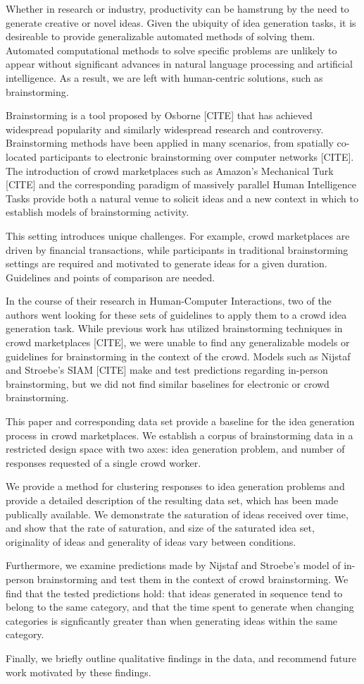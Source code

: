 Whether in research or industry, productivity can be hamstrung by the need to generate creative or novel ideas. Given the ubiquity of idea generation tasks, it is desireable to provide generalizable automated methods of solving them. Automated computational methods to solve specific problems are unlikely to appear without significant advances in natural language processing and artificial intelligence. As a result, we are left with human-centric solutions, such as brainstorming.

Brainstorming is a tool proposed by Osborne [CITE] that has achieved widespread popularity and similarly widespread research and controversy. Brainstorming methods have been applied in many scenarios, from spatially co-located participants to electronic brainstorming over computer networks [CITE]. The introduction of crowd marketplaces such as Amazon's Mechanical Turk [CITE] and the corresponding paradigm of massively parallel Human Intelligence Tasks provide both a natural venue to solicit ideas and a new context in which to establish models of brainstorming activity.

This setting introduces unique challenges. For example, crowd marketplaces are driven by financial transactions, while participants in traditional brainstorming settings are required and motivated to generate ideas for a given duration. Guidelines and points of comparison are needed.

In the course of their research in Human-Computer Interactions, two of the authors went looking for these sets of guidelines to apply them to a crowd idea generation task. While previous work has utilized brainstorming techniques in crowd marketplaces [CITE], we were unable to find any generalizable models or guidelines for brainstorming in the context of the crowd. Models such as Nijstaf and Stroebe's SIAM [CITE] make and test predictions regarding in-person brainstorming, but we did not find similar baselines for electronic or crowd brainstorming.

This paper and corresponding data set provide a baseline for the idea generation process in crowd marketplaces. We establish a corpus of brainstorming data in a restricted design space with two axes: idea generation problem, and number of responses requested of a single crowd worker.

We provide a method for clustering responses to idea generation problems and provide a detailed description of the resulting data set, which has been made publically available. We demonstrate the saturation of ideas received over time, and show that the rate of saturation, and size of the saturated idea set, originality of ideas and generality of ideas vary between conditions.

Furthermore, we examine predictions made by Nijstaf and Stroebe's model of in-person brainstorming and test them in the context of crowd brainstorming. We find that the tested predictions hold: that ideas generated in sequence tend to belong to the same category, and that the time spent to generate when changing categories is signficantly greater than when generating ideas within the same category.

Finally, we briefly outline qualitative findings in the data, and recommend future work motivated by these findings.